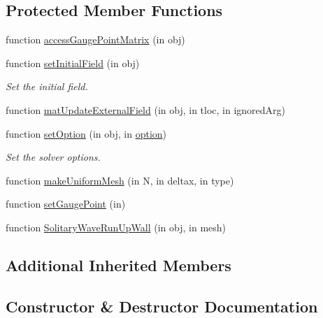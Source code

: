 \subsection*{Protected Member Functions}
\begin{DoxyCompactItemize}
\item 
function \hyperlink{class_nonhydrostatic_solitary_wave_run_up_wall_a65a68c8713f3ddbed1c0d473e68fe5ab}{access\+Gauge\+Point\+Matrix} (in obj)
\item 
function \hyperlink{class_nonhydrostatic_solitary_wave_run_up_wall_ac63e72eeab75b7f75c3d7a02a0c325b2}{set\+Initial\+Field} (in obj)
\begin{DoxyCompactList}\small\item\em Set the initial field. \end{DoxyCompactList}\item 
function \hyperlink{class_nonhydrostatic_solitary_wave_run_up_wall_a8ed6ccd0d58e59a1890bd63f7fadb449}{mat\+Update\+External\+Field} (in obj, in tloc, in ignored\+Arg)
\item 
function \hyperlink{class_nonhydrostatic_solitary_wave_run_up_wall_a7755138b4990aa55c4324e8b8fb5a5eb}{set\+Option} (in obj, in \hyperlink{class_ndg_phys_af91f4c54b93504e76b38a5693774dff1}{option})
\begin{DoxyCompactList}\small\item\em Set the solver options. \end{DoxyCompactList}\item 
function \hyperlink{class_nonhydrostatic_solitary_wave_run_up_wall_a0c6447c587ce0663c9c2a4bfd2abe79f}{make\+Uniform\+Mesh} (in N, in deltax, in type)
\item 
function \hyperlink{class_nonhydrostatic_solitary_wave_run_up_wall_a53ce48fcc1759f7bc393011124c37adf}{set\+Gauge\+Point} (in)
\item 
function \hyperlink{class_nonhydrostatic_solitary_wave_run_up_wall_a103b2f8c0dcd815bd8ada649e97a1494}{Solitary\+Wave\+Run\+Up\+Wall} (in obj, in mesh)
\end{DoxyCompactItemize}
\subsection*{Additional Inherited Members}


\subsection{Constructor \& Destructor Documentation}
\mbox{\label{class_nonhydrostatic_solitary_wave_run_up_wall_ada78062e14760d1fab87b0deef8f9028}} 
